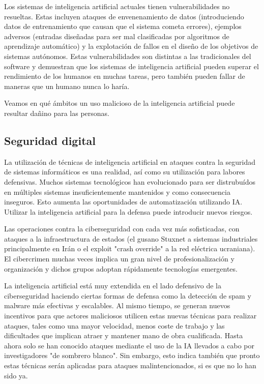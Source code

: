 \documentclass[12pt,a4paper]{article}
\begin{document}
Los sistemas de inteligencia artificial actuales tienen vulnerabilidades no resueltas. Estas incluyen ataques de envenenamiento de datos (introduciendo datos de entrenamiento que causan que el sistema cometa errores), ejemplos adversos (entradas diseñadas para ser mal clasificadas por algoritmos de aprendizaje automático) y la explotación de fallos en el diseño de los objetivos de sistemas autónomos. Estas vulnerabilidades son distintas a las tradicionales del software y demuestran que los sistemas de inteligencia artificial pueden superar el rendimiento de los humanos en muchas tareas, pero también pueden fallar de maneras que un humano nunca lo haría.

Veamos en qué ámbitos un uso malicioso de la inteligencia artificial puede resultar dañino para las personas.

\subsection{Seguridad digital}

La utilización de técnicas de inteligencia artificial en ataques contra la seguridad de sistemas informáticos es una realidad, así como su utilización para labores defensivas. Muchos sistemas tecnológicos han evolucionado para ser distrubuídos en múltiples sistemas insuficientemente mantenidos y como consecuencia inseguros. Esto aumenta las oportunidades de automatización utilizando IA. Utilizar la inteligencia artificial para la defensa puede introducir nuevos riesgos.

Las operaciones contra la ciberseguridad con cada vez más sofisticadas, con ataques a la infraestructura de estados (el gusano Stuxnet a sistemas industriales principalmente en Irán o el exploit "crash override" a la red eléctrica ucraniana). El cibercrimen muchas veces implica un gran nivel de profesionalización y organización y dichos grupos adoptan rápidamente tecnologías emergentes.

La inteligencia artificial está muy extendida en el lado defensivo de la ciberseguridad haciendo ciertas formas de defensa como la detección de spam y malware más efectivas y escalables. Al mismo tiempo, se generan nuevos incentivos para que actores maliciosos utilicen estas nuevas técnicas para realizar ataques, tales como una mayor velocidad, menos coste de trabajo y las dificultades que implican atraer y mantener mano de obra cualificada. Hasta ahora solo se han conocido ataques mediante el uso de la IA llevados a cabo por investigadores "de sombrero blanco". Sin embargo, esto indica también que pronto estas técnicas serán aplicadas para ataques malintencionados, si es que no lo han sido ya.
\end{document}
